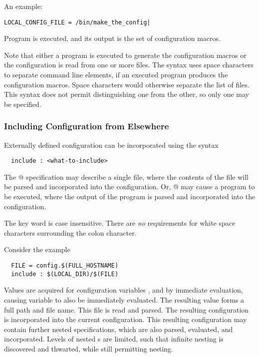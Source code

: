 An example:
\begin{verbatim}
LOCAL_CONFIG_FILE = /bin/make_the_config|
\end{verbatim}

Program  is executed, and its output
is the set of configuration macros.

Note that either a program is executed to generate the
configuration macros or the configuration is read from 
one or more files.
The syntax uses space characters to separate command line elements,
if an executed program produces the configuration macros.
Space characters would otherwise separate the list of files.
This syntax does not permit distinguishing one from the other,
so only one may be specified.

\subsubsection{\label{sec:Config-Include}Including Configuration from Elsewhere}
Externally defined configuration can be incorporated using the syntax
\begin{verbatim}
  include : <what-to-include>
\end{verbatim}

The @ specification may describe a single file,
where the contents of the file will be parsed and incorporated
into the configuration.
Or, @  may cause a program to be executed,
where the output of the program is parsed and incorporated
into the configuration.

The  key word is case insensitive.
There are \emph{no} requirements for white space characters surrounding
the colon character.

Consider the example
\begin{verbatim}
  FILE = config.$(FULL_HOSTNAME)
  include : $(LOCAL_DIR)/$(FILE)
\end{verbatim}
Values are acquired for configuration variables 
, and  by immediate evaluation, 
causing variable  to also be immediately evaluated.
The resulting value forms a full path and file name.
This file is read and parsed.
The resulting configuration is incorporated into the current
configuration.
This resulting configuration may contain further nested  
specifications, 
which are also parsed, evaluated, and incorporated.
Levels of nested s are limited,
such that infinite nesting is discovered and thwarted,
while still permitting nesting.

